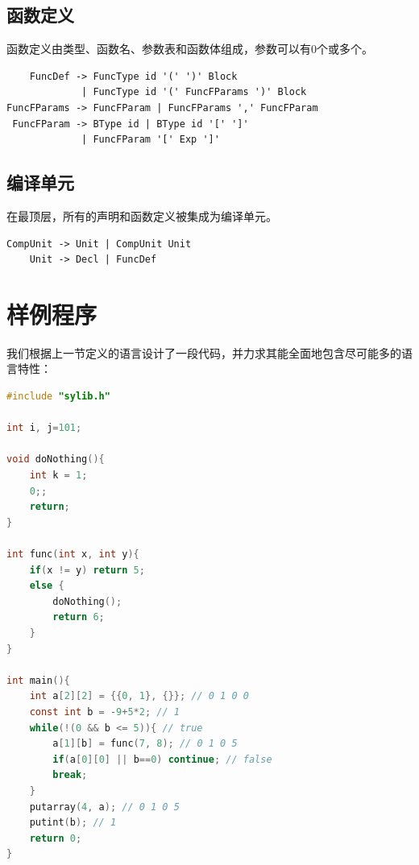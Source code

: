 \documentclass[UTF8,a4paper,10pt]{ctexart}
\begin{document}
    \subsection{函数定义}
    函数定义由类型、函数名、参数表和函数体组成，参数可以有0个或多个。
    \begin{lstlisting}
    FuncDef -> FuncType id '(' ')' Block
             | FuncType id '(' FuncFParams ')' Block
FuncFParams -> FuncFParam | FuncFParams ',' FuncFParam
 FuncFParam -> BType id | BType id '[' ']'
             | FuncFParam '[' Exp ']'
    \end{lstlisting}

    \subsection{编译单元}
    在最顶层，所有的声明和函数定义被集成为编译单元。
    \begin{lstlisting}
CompUnit -> Unit | CompUnit Unit
    Unit -> Decl | FuncDef
    \end{lstlisting}

\section{样例程序}
    我们根据上一节定义的语言设计了一段代码，并力求其能全面地包含尽可能多的语言特性：
    \begin{lstlisting}[title=SysY语言样例程序, frame=trbl, language={C}]
#include "sylib.h"

int i, j=101;

void doNothing(){
    int k = 1;
    0;;
    return;
}

int func(int x, int y){
    if(x != y) return 5;
    else {
        doNothing();
        return 6;
    }
}

int main(){
    int a[2][2] = {{0, 1}, {}}; // 0 1 0 0
    const int b = -9+5*2; // 1
    while(!(0 && b <= 5)){ // true
        a[1][b] = func(7, 8); // 0 1 0 5
        if(a[0][0] || b==0) continue; // false
        break;
    }
    putarray(4, a); // 0 1 0 5
    putint(b); // 1
    return 0;
}
    \end{lstlisting}
\end{document}
